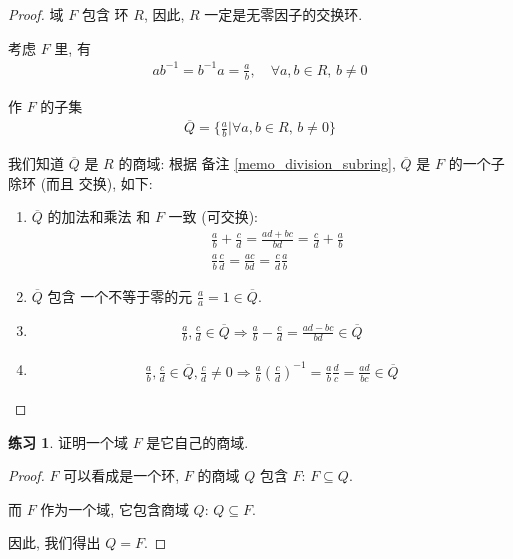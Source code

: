 \documentclass[utf8]{ctexbook}
\theoremstyle{definition}
\newtheorem{exercise}{练习}[section]
\begin{document}
\begin{proof}
域 $F$ 包含 环 $R$, 因此, $R$ 一定是无零因子的交换环.

考虑 $F$ 里, 有
\begin{align*}
a b^{-1} = b^{-1} a = \frac{a}{b} , \quad \forall a , b \in R, \, b \neq 0
\end{align*}

作 $F$ 的子集
\begin{align*}
\overline{Q} = \{ \frac{a}{b} |  \forall a , b \in R, \, b \neq 0 \}
\end{align*}

我们知道 $\overline{Q}$ 是 $R$ 的商域: 根据 备注 \ref{memo_division_subring}, $\overline{Q}$ 是 $F$ 的一个子除环 (而且 交换), 如下:
\begin{enumerate}
\item{$\overline{Q}$ 的加法和乘法 和 $F$ 一致 (可交换):
\begin{align*}
& \frac{a}{b} + \frac{c}{d} = \frac{ad + bc}{bd} =  \frac{c}{d} + \frac{a}{b}\\
& \frac{a}{b} \frac{c}{d} = \frac{ac}{bd} = \frac{c}{d} \frac{a}{b}
\end{align*}
}
\item{$\overline{Q}$ 包含 一个不等于零的元 $\frac{a}{a} = 1 \in \overline{Q}$.}
\item{
\begin{align*}
\frac{a}{b}, \frac{c}{d} \in \overline{Q} \Longrightarrow \frac{a}{b} - \frac{c}{d} = \frac{ad - bc}{bd} \in \overline{Q}
\end{align*}
}
\item{
\begin{align*}
\frac{a}{b}, \frac{c}{d} \in \overline{Q} , \frac{c}{d} \neq 0 \Longrightarrow \frac{a}{b} \left( \frac{c}{d} \right)^{-1} = \frac{a}{b} \frac{d}{c} = \frac{a d}{b c} \in \overline{Q} 
\end{align*}
}
\end{enumerate}
\end{proof}

\begin{exercise}
证明一个域 $F$ 是它自己的商域.
\end{exercise}


\begin{proof}
$F$ 可以看成是一个环, $F$ 的商域 $Q$ 包含 $F$: $F \subseteq Q$. 

而 $F$ 作为一个域, 它包含商域 $Q$: $Q \subseteq F$.

因此, 我们得出 $Q = F$.
\end{proof}
\end{document}
